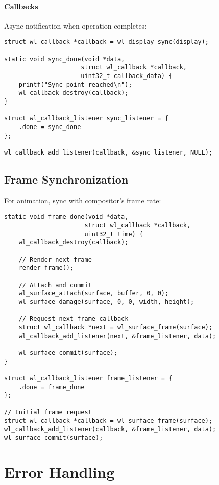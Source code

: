 \paragraph{Callbacks}
Async notification when operation completes:
\begin{lstlisting}[style=cstyle, caption=Sync Callback]
struct wl_callback *callback = wl_display_sync(display);

static void sync_done(void *data,
                     struct wl_callback *callback,
                     uint32_t callback_data) {
    printf("Sync point reached\n");
    wl_callback_destroy(callback);
}

struct wl_callback_listener sync_listener = {
    .done = sync_done
};

wl_callback_add_listener(callback, &sync_listener, NULL);
\end{lstlisting}

\subsection{Frame Synchronization}

For animation, sync with compositor's frame rate:

\begin{lstlisting}[style=cstyle, caption=Frame Callbacks]
static void frame_done(void *data,
                      struct wl_callback *callback,
                      uint32_t time) {
    wl_callback_destroy(callback);

    // Render next frame
    render_frame();

    // Attach and commit
    wl_surface_attach(surface, buffer, 0, 0);
    wl_surface_damage(surface, 0, 0, width, height);

    // Request next frame callback
    struct wl_callback *next = wl_surface_frame(surface);
    wl_callback_add_listener(next, &frame_listener, data);

    wl_surface_commit(surface);
}

struct wl_callback_listener frame_listener = {
    .done = frame_done
};

// Initial frame request
struct wl_callback *callback = wl_surface_frame(surface);
wl_callback_add_listener(callback, &frame_listener, data);
wl_surface_commit(surface);
\end{lstlisting}

\section{Error Handling}

